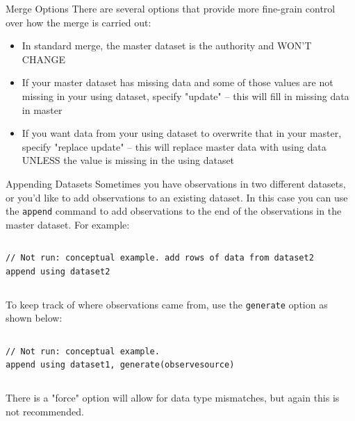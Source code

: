 \documentclass[table,smaller]{beamer}
\begin{document}
\begin{frame}[label=sec-6-3]{Merge Options}
There are several options that provide more fine-grain control over how the merge is carried out:
\begin{itemize}
\item In standard merge, the master dataset is the authority and WON'T CHANGE
\item If your master dataset has missing data and some of those values are not missing in your using dataset, specify "update" -- this will fill in missing data in master
\item If you want data from your using dataset to overwrite that in your master, specify "replace update" -- this will replace master data with using data UNLESS the value is missing in the using dataset
\end{itemize}
\end{frame}

\begin{frame}[fragile,label=sec-6-4]{Appending Datasets}
 Sometimes you have observations in two  different datasets, or you'd like to add  observations to an existing dataset. In this case you can use the \verb~append~ command to add observations to the end of the observations in the master dataset. For example:

\vspace{-.5em} \begin{columns}  \begin{block}{}
\begin{verbatim}
// Not run: conceptual example. add rows of data from dataset2 
append using dataset2
\end{verbatim}
\end{block} \end{columns}

To keep track of where observations came from, use the \verb~generate~ option as shown below:

\vspace{-.5em} \begin{columns}  \begin{block}{}
\begin{verbatim}
// Not run: conceptual example.
append using dataset1, generate(observesource)
\end{verbatim}
\end{block} \end{columns}

There is a "force" option will allow for data type mismatches, but again this is not recommended.
\end{frame}
\end{document}
